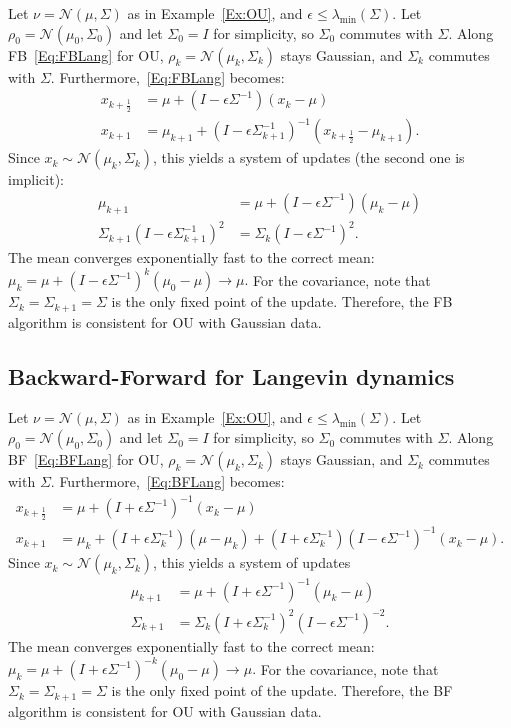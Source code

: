 \documentclass[final,12pt]{colt2018}
\newcommand{\N}{\mathcal{N}}
\begin{document}
\begin{example}\label{Ex:OUFB}
Let $\nu = \N(\mu,\Sigma)$ as in Example~\ref{Ex:OU}, and $\epsilon \le \lambda_{\min}(\Sigma)$.
Let $\rho_0 = \N(\mu_0,\Sigma_0)$ and let $\Sigma_0 = I$ for simplicity, so $\Sigma_0$ commutes with $\Sigma$.
Along FB~\eqref{Eq:FBLang} for OU, $\rho_k = \N(\mu_k,\Sigma_k)$ stays Gaussian, and $\Sigma_k$ commutes with $\Sigma$.
Furthermore,~\eqref{Eq:FBLang} becomes: 
\begin{align*}
x_{k+\frac{1}{2}} &= \mu + (I-\epsilon \Sigma^{-1}) (x_k-\mu) \\
x_{k+1} &= \mu_{k+1} + (I - \epsilon \Sigma_{k+1}^{-1})^{-1}(x_{k+\frac{1}{2}}-\mu_{k+1}).
\end{align*}
Since $x_k \sim \N(\mu_k,\Sigma_k)$, this yields a system of updates (the second one is implicit):
\begin{align*}
\mu_{k+1} &= \mu + (I-\epsilon \Sigma^{-1})(\mu_k-\mu) \\
\Sigma_{k+1} (I-\epsilon \Sigma_{k+1}^{-1})^2 &= \Sigma_k(I-\epsilon \Sigma^{-1})^2.
\end{align*}
The mean converges exponentially fast to the correct mean:
$\mu_k = \mu + (I-\epsilon \Sigma^{-1})^k (\mu_0-\mu) \to \mu.$
For the covariance, note that $\Sigma_k = \Sigma_{k+1} = \Sigma$ is the only fixed point of the update.
Therefore, the FB algorithm is consistent for OU with Gaussian data.
\end{example}


\subsection{Backward-Forward for Langevin dynamics}
\label{App:BFLang}

\begin{example}\label{Ex:OUBF}
Let $\nu = \N(\mu,\Sigma)$ as in Example~\ref{Ex:OU}, and $\epsilon \le \lambda_{\min}(\Sigma)$.
Let $\rho_0 = \N(\mu_0,\Sigma_0)$ and let $\Sigma_0 = I$ for simplicity, so $\Sigma_0$ commutes with $\Sigma$.
Along BF~\eqref{Eq:BFLang} for OU, $\rho_k = \N(\mu_k,\Sigma_k)$ stays Gaussian, and $\Sigma_k$ commutes with $\Sigma$.
Furthermore,~\eqref{Eq:BFLang} becomes: 
\begin{align*}
x_{k+\frac{1}{2}} &= \mu + (I+\epsilon \Sigma^{-1})^{-1} (x_k-\mu) \\
x_{k+1} &= \mu_k + (I + \epsilon \Sigma_k^{-1})(\mu-\mu_k) + (I + \epsilon \Sigma_k^{-1})(I-\epsilon \Sigma^{-1})^{-1} (x_k-\mu).
\end{align*}
Since $x_k \sim \N(\mu_k,\Sigma_k)$, this yields a system of updates
\begin{align*}
\mu_{k+1} &= \mu + (I+\epsilon \Sigma^{-1})^{-1}(\mu_k-\mu) \\
\Sigma_{k+1} &= \Sigma_k(I + \epsilon \Sigma_k^{-1})^2(I-\epsilon \Sigma^{-1})^{-2}.
\end{align*}
The mean converges exponentially fast to the correct mean:
$\mu_k = \mu + (I+\epsilon \Sigma^{-1})^{-k} (\mu_0-\mu) \to \mu.$
For the covariance, note that $\Sigma_k = \Sigma_{k+1} = \Sigma$ is the only fixed point of the update.
Therefore, the BF algorithm is consistent for OU with Gaussian data.
\end{example}
\end{document}
